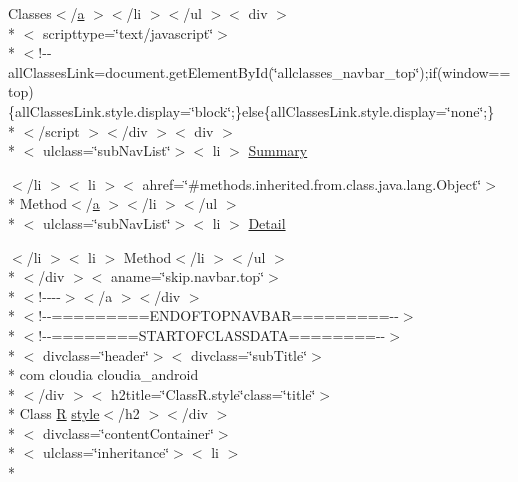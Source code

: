 \begin{DoxyCompactItemize}
\item 
Classes$<$/\hyperlink{style_8css_a5e8981582017bb8b84c21f148345d1f7}{a} $>$$<$/li $>$$<$/ul $>$$<$ div $>$\\*
$<$ scripttype=\char`\"{}text/javascript\char`\"{}$>$\\*
$<$!-\/-\/all\-Classes\-Link=document.\-get\-Element\-By\-Id(\char`\"{}allclasses\-\_\-navbar\-\_\-top\char`\"{});if(window==top)\{all\-Classes\-Link.\-style.\-display=\char`\"{}block\char`\"{};\}else\{all\-Classes\-Link.\-style.\-display=\char`\"{}none\char`\"{};\}\\*
$<$/script $>$$<$/div $>$$<$ div $>$\\*
$<$ ulclass=\char`\"{}sub\-Nav\-List\char`\"{}$>$$<$ li $>$ \hyperlink{_r_8style_8html_a6f9ab45abc9b0679dc1b132fbacfc681}{Summary}
\item 
$<$/li $>$$<$ li $>$$<$ ahref=\char`\"{}\#methods.\-inherited.\-from.\-class.\-java.\-lang.\-Object\char`\"{}$>$\\*
 Method$<$/\hyperlink{style_8css_a5e8981582017bb8b84c21f148345d1f7}{a} $>$$<$/li $>$$<$/ul $>$\\*
$<$ ulclass=\char`\"{}sub\-Nav\-List\char`\"{}$>$$<$ li $>$ \hyperlink{_r_8style_8html_aed0df2ae11502bf9389ac3cf53b1c0f6}{Detail}
\item 
$<$/li $>$$<$ li $>$ Method$<$/li $>$$<$/ul $>$\\*
$<$/div $>$$<$ aname=\char`\"{}skip.\-navbar.\-top\char`\"{}$>$\\*
$<$!-\/-\/-\/-\/$>$$<$/a $>$$<$/div $>$\\*
$<$!-\/-\/=========E\-N\-D\-O\-F\-T\-O\-P\-N\-A\-V\-B\-A\-R=========-\/-\/$>$\\*
$<$!-\/-\/========S\-T\-A\-R\-T\-O\-F\-C\-L\-A\-S\-S\-D\-A\-T\-A========-\/-\/$>$\\*
$<$ divclass=\char`\"{}header\char`\"{}$>$$<$ divclass=\char`\"{}sub\-Title\char`\"{}$>$\\*
 com cloudia cloudia\-\_\-android\\*
$<$/div $>$$<$ h2title=\char`\"{}Class\-R.\-style\char`\"{}class=\char`\"{}title\char`\"{}$>$\\*
 Class \hyperlink{index-16_8html_a31e8fe59be5c20ce90a0090e28a0c1fe}{R} \hyperlink{index-17_8html_a2fca283fccfc942ace907bc315fb6b4e}{style}$<$/h2 $>$$<$/div $>$\\*
$<$ divclass=\char`\"{}content\-Container\char`\"{}$>$\\*
$<$ ulclass=\char`\"{}inheritance\char`\"{}$>$$<$ li $>$\\*

\end{DoxyCompactItemize}
